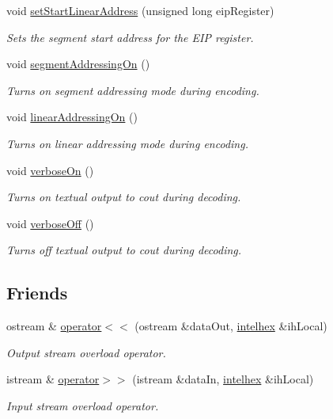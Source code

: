 \begin{DoxyCompactItemize}
void \hyperlink{classintelhex_a7629ca097b2de02dea37fcaa2dc2709c}{set\-Start\-Linear\-Address} (unsigned long eip\-Register)
\begin{DoxyCompactList}\small\item\em Sets the segment start address for the E\-I\-P register. \end{DoxyCompactList}\item 
void \hyperlink{classintelhex_a489fc3b9c34542def2a5167192b291da}{segment\-Addressing\-On} ()
\begin{DoxyCompactList}\small\item\em Turns on segment addressing mode during encoding. \end{DoxyCompactList}\item 
void \hyperlink{classintelhex_a5055edd337d19037ab254a27016267f8}{linear\-Addressing\-On} ()
\begin{DoxyCompactList}\small\item\em Turns on linear addressing mode during encoding. \end{DoxyCompactList}\item 
void \hyperlink{classintelhex_ac6a0119a04a2090af3ffe8c33a37cbc9}{verbose\-On} ()
\begin{DoxyCompactList}\small\item\em Turns on textual output to cout during decoding. \end{DoxyCompactList}\item 
void \hyperlink{classintelhex_a3958f077a662291bbde3472ea2bcfb4d}{verbose\-Off} ()
\begin{DoxyCompactList}\small\item\em Turns off textual output to cout during decoding. \end{DoxyCompactList}\end{DoxyCompactItemize}
\subsection*{Friends}
\begin{DoxyCompactItemize}
\item 
ostream \& \hyperlink{classintelhex_a320e23dab311a6c652aa7ddb9e2f9cc2}{operator$<$$<$} (ostream \&data\-Out, \hyperlink{classintelhex}{intelhex} \&ih\-Local)
\begin{DoxyCompactList}\small\item\em Output stream overload operator. \end{DoxyCompactList}\item 
istream \& \hyperlink{classintelhex_a73fb9c5b9d6d069b5eb83340942fd54b}{operator$>$$>$} (istream \&data\-In, \hyperlink{classintelhex}{intelhex} \&ih\-Local)
\begin{DoxyCompactList}\small\item\em Input stream overload operator. \end{DoxyCompactList}\end{DoxyCompactItemize}


